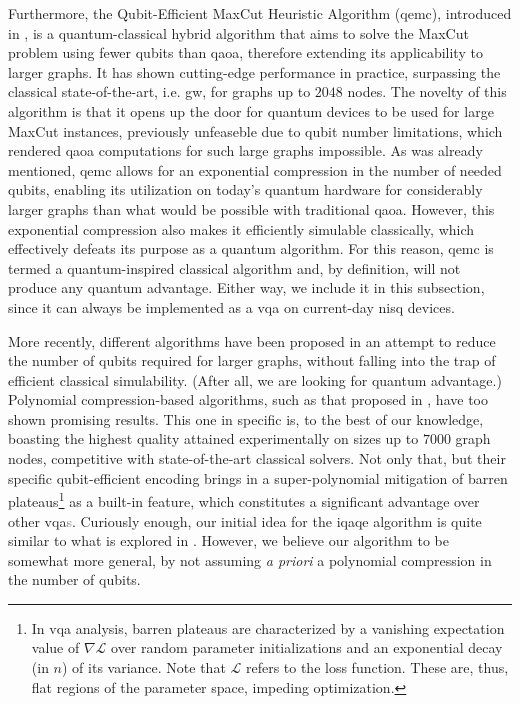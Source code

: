 Furthermore, the Qubit-Efficient MaxCut Heuristic Algorithm (\acrshort{qemc}), introduced in \cite{tenecohen2023variational}, is a quantum-classical hybrid algorithm that aims to solve the MaxCut problem using fewer qubits than \acrshort{qaoa}, therefore extending its applicability to larger graphs. It has shown cutting-edge performance in practice, surpassing the classical state-of-the-art, i.e. \acrshort{gw}, for graphs up to $2048$ nodes. The novelty of this algorithm is that it opens up the door for quantum devices to be used for large MaxCut instances, previously unfeaseble due to qubit number limitations, which rendered \acrshort{qaoa} computations for such large graphs impossible. As was already mentioned, \acrshort{qemc} allows for an exponential compression in the number of needed qubits, enabling its utilization on today's quantum hardware for considerably larger graphs than what would be possible with traditional \acrshort{qaoa}. However, this exponential compression also makes it efficiently simulable classically, which effectively defeats its purpose as a quantum algorithm. For this reason, \acrshort{qemc} is termed a quantum-inspired classical algorithm and, by definition, will not produce any quantum advantage. Either way, we include it in this subsection, since it can always be implemented as a \acrshort{vqa} on current-day \acrshort{nisq} devices.

More recently, different algorithms have been proposed in an attempt to reduce the number of qubits required for larger graphs, without falling into the trap of efficient classical simulability. (After all, we are looking for quantum advantage.) Polynomial compression-based algorithms, such as that proposed in \cite{sciorilli2024largescale}, have too shown promising results. This one in specific \cite{sciorilli2024largescale} is, to the best of our knowledge, boasting the highest quality attained experimentally on sizes up to $7000$ graph nodes, competitive with state-of-the-art classical solvers. Not only that, but their specific qubit-efficient encoding brings in a super-polynomial mitigation of barren plateaus\footnote{In \acrshort{vqa} analysis, barren plateaus are characterized by a vanishing expectation value of $\nabla{\mathcal{L}}$ over random parameter initializations and an exponential decay (in $n$) of its variance. Note that $\mathcal{L}$ refers to the loss function. These are, thus, flat regions of the parameter space, impeding optimization.} as a built-in feature, which constitutes a significant advantage over other \acrshort{vqa}\textcolor{gray}{s}. Curiously enough, our initial idea for the \acrshort{iqaqe} algorithm is quite similar to what is explored in \cite{sciorilli2024largescale}. However, we believe our algorithm to be somewhat more general, by not assuming \textit{a priori} a polynomial compression in the number of qubits.

